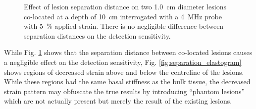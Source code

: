 			\begin{figure}[!t]
				\centering
				\caption[Quasi-static lesion separation distance characterization]{Effect of lesion separation distance on two \SI{1.0}{\cm} diameter lesions co-located at a depth of \SI{10}{\cm} interrogated with a \SI{4}{\MHz} probe with \SI{5}{\percent} applied strain. There is no negligible difference between separation distances on the detection sensitivity.}
				\label{fig:separation_characterization}
			\end{figure}

			While Fig. \ref{fig:separation_characterization} shows that the separation distance between co-located lesions causes a negligible effect on the detection sensitivity, Fig. \ref{fig:separation_elastogram} shows regions of decreased strain above and below the centreline of the lesions. While these regions had the same basal stiffness as the bulk tissue, the decreased strain pattern may obfuscate the true results by introducing ``phantom lesions'' which are not actually present but merely the result of the existing lesions.

